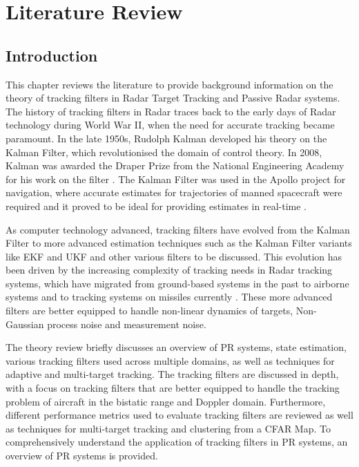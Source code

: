 \newpage
\chapter{Literature Review}
\section{Introduction}
This chapter reviews the literature to provide background information on the theory of tracking filters in \ac{Radar} Target Tracking and Passive \ac{Radar} systems. The history of tracking filters in \ac{Radar} traces back to the early days of \ac{Radar} technology during World War II, when the need for accurate tracking became paramount. In the late 1950s, Rudolph Kalman developed his theory on the Kalman Filter, which revolutionised the domain of control theory. In 2008, Kalman was awarded the Draper Prize from the National Engineering Academy for his work on the filter \cite{kalmanNAE}. The Kalman Filter was used in the Apollo project for navigation, where accurate estimates for trajectories of manned spacecraft were required and it proved to be ideal for providing estimates in real-time \cite{Andrews2010}.

As computer technology advanced, tracking filters have evolved from the Kalman Filter to more advanced estimation techniques such as the Kalman Filter variants like \ac{EKF} and \ac{UKF} and other various filters to be discussed. This evolution has been driven by the increasing complexity of tracking needs in \ac{Radar} tracking systems, which have migrated from ground-based systems in the past to airborne systems and to tracking systems on missiles currently \cite{Andrews2010}. These more advanced filters are better equipped to handle non-linear dynamics of targets, Non-Gaussian process noise and measurement noise.

The theory review briefly discusses an overview of \ac{PR} systems, state estimation, various tracking filters used across multiple domains, as well as techniques for adaptive and multi-target tracking. The tracking filters are discussed in depth, with a focus on tracking filters that are better equipped to handle the tracking problem of aircraft in the bistatic range and Doppler domain. Furthermore, different performance metrics used to evaluate tracking filters are reviewed as well as techniques for multi-target tracking and clustering from a \ac{CFAR} Map. To comprehensively understand the application of tracking filters in \ac{PR} systems, an overview of  \ac{PR} systems is provided.
